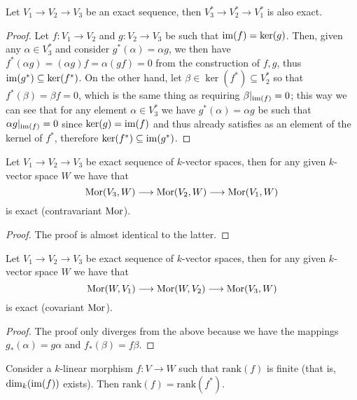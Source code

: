 \begin{proposition}
    Let \(V_1 \to V_2 \to V_3\) be an exact sequence, then \(V_3^\ast \to
    V_2^\ast \to V_1^\ast\) is also exact.
\end{proposition}

\begin{proof}
    Let \(f: V_1 \to V_2\) and \(g: V_2 \to V_3\) be such that \(\operatorname{im}(f) =
    \ker(g)\). Then, given any \(\alpha \in V_3^\ast\) and consider
    \(g^\ast(\alpha) = \alpha  g\), we then have \(f^\ast(\alpha  g) =
    (\alpha  g)  f = \alpha  (g  f) = 0\) from the
    construction of \(f, g\), thus \(\operatorname{im}(g^\ast) \subseteq \ker(f^\ast)\). On the
    other hand, let \(\beta \in \ker(f^\ast) \subseteq V_2^\ast\) so that
    \(f^\ast(\beta) = \beta  f = 0\), which is the same thing as requiring
    \(\beta|_{\operatorname{im}(f)} = 0\); this way we can see that for any element \(\alpha \in
    V_3^\ast\) we have \(g^\ast(\alpha) = \alpha  g\) be such that \(\alpha
    g|_{\operatorname{im}(f)} = 0\) since \(\ker(g) = \operatorname{im}(f)\) and thus already satisfies
    as an element of the kernel of \(f^\ast\), therefore \(\ker(f^\ast) \subseteq
    \operatorname{im}(g^\ast)\).
\end{proof}

\begin{proposition}
    Let \(V_1 \to V_2 \to V_3\) be exact sequence of \(k\)-vector spaces, then for
    any given \(k\)-vector space \(W\) we have that
    \[
        \operatorname{Mor}(V_3, W) \longrightarrow \operatorname{Mor}(V_2, W) \longrightarrow \operatorname{Mor}(V_1, W)
    \]
    is exact (contravariant \(\operatorname{Mor}\)).
\end{proposition}

\begin{proof}
    The proof is almost identical to the latter.
\end{proof}

\begin{proposition}
    Let \(V_1 \to V_2 \to V_3\) be exact sequence of \(k\)-vector spaces, then for
    any given \(k\)-vector space \(W\) we have that
    \[
        \operatorname{Mor}(W, V_1) \longrightarrow \operatorname{Mor}(W, V_2) \longrightarrow \operatorname{Mor}(V_3, W)
    \]
    is exact (covariant \(\operatorname{Mor}\)).
\end{proposition}

\begin{proof}
    The proof only diverges from the above because we have the mappings
    \(g_\ast(\alpha) = g  \alpha\) and \(f_\ast(\beta) = f  \beta\).
\end{proof}

\begin{proposition}
    Consider a \(k\)-linear morphism \(f : V \to W\) such that \(\mathrm{rank}(f)\) is
    finite (that is, \(\dim_k(\operatorname{im}(f))\) exists). Then \(\mathrm{rank}(f) =
    \mathrm{rank}(f^\ast)\).
\end{proposition}

